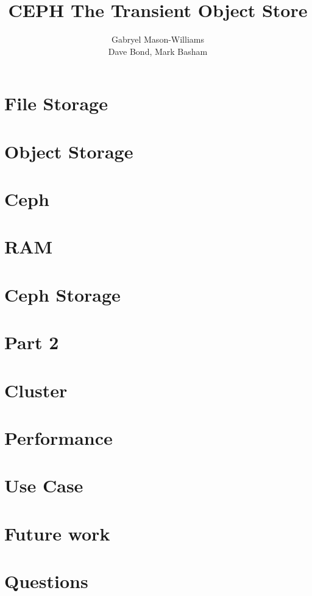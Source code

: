 \documentclass[notes,11pt]{beamer}
\title[RAM Based CEPH]{CEPH The Transient Object Store}
\author[me]{Gabryel Mason-Williams\\[3mm] Dave Bond, Mark Basham}
\begin{document}
% 



\section{File Storage}

\section{Object Storage}

\section{Ceph} 

\section{RAM}

\section{Ceph Storage}

\section{Part 2}

\section{Cluster}

\section{Performance}

\section{Use Case}

\section{Future work}

\section{Questions}

\end{document}
